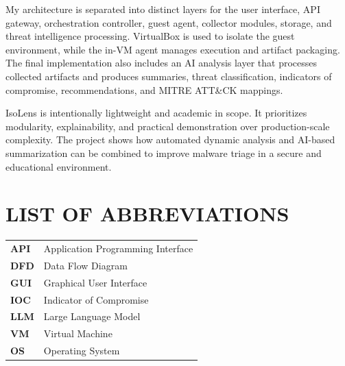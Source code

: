 \documentclass[a4paper,12pt,oneside]{report}
\begin{document}
\par

\par

My architecture is separated into distinct layers for the user interface, API gateway, orchestration controller, guest agent, collector modules, storage, and threat intelligence processing. VirtualBox is used to isolate the guest environment, while the in-VM agent manages execution and artifact packaging. The final implementation also includes an AI analysis layer that processes collected artifacts and produces summaries, threat classification, indicators of compromise, recommendations, and MITRE ATT\&CK mappings.

\par

\par

IsoLens is intentionally lightweight and academic in scope. It prioritizes modularity, explainability, and practical demonstration over production-scale complexity. The project shows how automated dynamic analysis and AI-based summarization can be combined to improve malware triage in a secure and educational environment.

\newpage
\tableofcontents

\newpage
\listoffigures
{}

\newpage
\listoftables
{}

\newpage
\chapter*{\uppercase{List of Abbreviations}}
\begin{table}[H]
\renewcommand{\arraystretch}{1.5}
\begin{tabularx}{\textwidth}{>{\bfseries}l X}
API & Application Programming Interface \\
DFD & Data Flow Diagram \\
GUI & Graphical User Interface \\
IOC & Indicator of Compromise \\
LLM & Large Language Model \\
VM & Virtual Machine \\
OS & Operating System \\
\end{tabularx}
\end{table}
\end{document}
